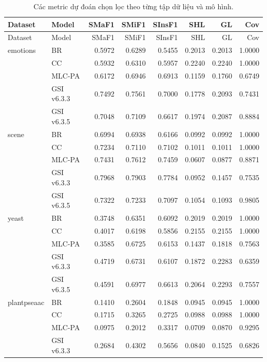 \documentclass[11pt,a4paper,twoside]{article}
\begin{document}
\begin{landscape}
\begin{longtable}{llrrrrrr}
\caption{Các metric dự đoán chọn lọc theo từng tập dữ liệu và mô hình.}\label{tab:appendix-2}\\
\toprule
Dataset & Model & SMaF1 & SMiF1 & SInsF1 & SHL & GL & Cov \\
\midrule
\endfirsthead
\toprule
Dataset & Model & SMaF1 & SMiF1 & SInsF1 & SHL & GL & Cov \\
\midrule
\endhead
emotions & BR & 0.5972 & 0.6289 & 0.5455 & 0.2013 & 0.2013 & 1.0000 \\
 & CC & 0.5932 & 0.6310 & 0.5957 & 0.2240 & 0.2240 & 1.0000 \\
 & MLC-PA & 0.6172 & 0.6946 & 0.6913 & 0.1159 & 0.1760 & 0.6749 \\
 & GSI v6.3.3 & 0.7492 & 0.7561 & 0.7000 & 0.1778 & 0.2093 & 0.7431 \\
 & GSI v6.3.5 & 0.7048 & 0.7109 & 0.6617 & 0.1974 & 0.2087 & 0.8884 \\
\addlinespace[2pt]
scene & BR & 0.6994 & 0.6938 & 0.6166 & 0.0992 & 0.0992 & 1.0000 \\
 & CC & 0.7234 & 0.7110 & 0.7102 & 0.1011 & 0.1011 & 1.0000 \\
 & MLC-PA & 0.7431 & 0.7612 & 0.7459 & 0.0607 & 0.0877 & 0.8871 \\
 & GSI v6.3.3 & 0.7968 & 0.7903 & 0.7784 & 0.0952 & 0.1457 & 0.7535 \\
 & GSI v6.3.5 & 0.7322 & 0.7233 & 0.7097 & 0.1054 & 0.1093 & 0.9805 \\
\addlinespace[2pt]
yeast & BR & 0.3748 & 0.6351 & 0.6092 & 0.2019 & 0.2019 & 1.0000 \\
 & CC & 0.4017 & 0.6198 & 0.5856 & 0.2155 & 0.2155 & 1.0000 \\
 & MLC-PA & 0.3585 & 0.6725 & 0.6153 & 0.1437 & 0.1818 & 0.7563 \\
 & GSI v6.3.3 & 0.4719 & 0.6731 & 0.6107 & 0.1872 & 0.2283 & 0.6359 \\
 & GSI v6.3.5 & 0.4591 & 0.6977 & 0.6613 & 0.2064 & 0.2293 & 0.7557 \\
\addlinespace[2pt]
plantpseaac & BR & 0.1410 & 0.2604 & 0.1848 & 0.0945 & 0.0945 & 1.0000 \\
 & CC & 0.1715 & 0.3265 & 0.2725 & 0.0988 & 0.0988 & 1.0000 \\
 & MLC-PA & 0.0975 & 0.2012 & 0.3317 & 0.0709 & 0.0870 & 0.9295 \\
 & GSI v6.3.3 & 0.2684 & 0.4302 & 0.5656 & 0.0840 & 0.1525 & 0.6826 \\

\end{longtable}
\end{landscape}
\end{document}
